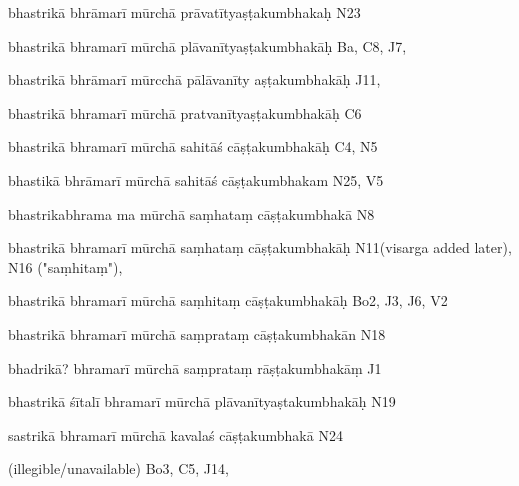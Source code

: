 \begin{ekdosis}
\begin{marma}[hp01_055]
\begin{marma}[hp02_009]
\begin{marma}[hp02_011]
\begin{marma}[hp02_44cd]
\item[bhastrikā bhrāmarī mūrchā prāvatītyaṣṭakumbhakaḥ] N23 
\item[bhastrikā bhramarī mūrchā plāvanītyaṣṭakumbhakāḥ] Ba, C8, J7, 
\item[bhastrikā bhrāmarī mūrcchā pālāvanīty aṣṭakumbhakāḥ] J11,
\item[bhastrikā bhramarī mūrchā pratvanītyaṣṭakumbhakāḥ] C6
\item[bhastrikā bhramarī mūrchā sahitāś cāṣṭakumbhakāḥ] C4, N5
\item[bhastikā bhrāmarī mūrchā sahitāś cāṣṭakumbhakam] N25, V5
\item[bhastrikabhrama ma mūrchā saṃhataṃ cāṣṭakumbhakā] N8
\item[bhastrikā bhramarī mūrchā saṃhataṃ cāṣṭakumbhakāḥ] N11(visarga added later), N16 ("saṃhitaṃ"),
\item[bhastrikā bhramarī mūrchā saṃhitaṃ cāṣṭakumbhakāḥ] Bo2, J3, J6, V2
\item[bhastrikā bhramarī mūrchā saṃprataṃ cāṣṭakumbhakān] N18
\item[bhadrikā? bhramarī mūrchā saṃprataṃ rāṣṭakumbhakāṃ] J1
\item[bhastrikā śītalī bhramarī mūrchā plāvanītyaṣtakumbhakāḥ] N19 
\item[sastrikā bhramarī mūrchā kavalaś cāṣṭakumbhakā] N24
\item[(illegible/unavailable)] Bo3, C5, J14, 
 \begin{description}

        \end{description}
\end{marma}


\end{marma}
\end{marma}
\end{marma}
\end{ekdosis}
